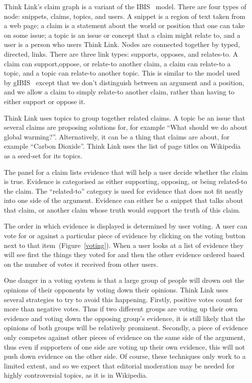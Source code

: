 \documentclass{chi2009}
\newcommand{\todo}[1]{{[\color{blue} TODO: #1]}}
\begin{document}

Think Link's claim graph is a variant of the IBIS~\cite{Rittel1973} model. There are four types of node: snippets, claims, topics, and users. A snippet is a region of text taken from a web page; a claim is a statement about the world or position that one can take on some issue; a topic is an issue or concept that a claim might relate to, and a user is a person who users Think Link. Nodes are connected together by typed, directed, links. There are three link types: supports, opposes, and relates-to. A claim can support,oppose, or relate-to another claim, a claim can relate-to a topic, and a topic can relate-to another topic. This is similar to the model used by gIBIS~\cite{Conklin1987} except that we don't distinguish between an argument and a position, and we allow a claim to simply relate-to another claim, rather than having to either support or oppose it.

Think Link uses topics to group together related claims. A topic be an issue that several claims are proposing solutions for, for example ``What should we do about global warming?''. Alternatively, it can be a thing that claims are about, for example ``Carbon Dioxide''. Think Link uses the list of page titles on Wikipedia as a seed-set for its topics.

The panel for a claim lists evidence that will help a user decide whether the claim is true. Evidence is categorised as either supporting, opposing, or being related-to the claim. The ``related-to'' category is used for evidence that does not fit neatly into one side of the argument. Evidence can either be a snippet that talks about that claim, or another claim whose truth would support the truth of this claim. 

The order in which evidence is displayed is determined by user voting. A user can vote for or against a particular piece of evidence by clicking on the voting button next to that item~(Figure~\ref{voting}). When a user looks at a list of evidence they will see first the things they voted for and then the other evidence ordered based on the number of votes it received from other users.

One danger in a voting system is that a large group of people will drown out the opinions of their opponents by voting down their opinions. Think Link uses several strategies to try to avoid this happening. Firstly, positive votes count for more than negative votes. Thus if two different groups are voting up their own evidence and voting down the opposing group's evidence, it is still likely that the opinions of both groups will be relatively prominent. Secondly, a piece of evidence only competes against other pieces of evidence on the same side of the argument, thus even if supporters of one side are voting up their own evidence, this will not push down evidence on the other side. Of course, these techniques only work to a limited extent, and so we expect that editorial moderation may be needed for highly controversial topics, as it is in Wikipedia.
\end{document}
